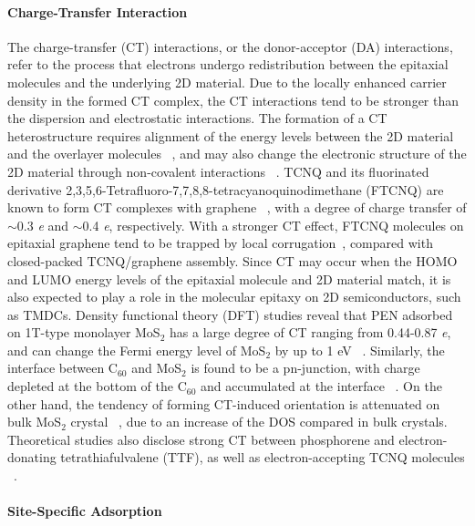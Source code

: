 \paragraph{Charge-Transfer Interaction}
\label{sec:orgebfad7b}

The charge-transfer (CT) interactions, or the donor-acceptor (DA)
interactions, refer to the process that electrons undergo
redistribution between the epitaxial molecules and the underlying 2D
material. Due to the locally enhanced carrier density in the formed CT
complex, the CT interactions tend to be stronger than the dispersion
and electrostatic interactions. The formation of a CT heterostructure
requires alignment of the energy levels between the 2D material and
the overlayer molecules ~\cite{Akiyoshi_2015_DA}, and may also change
the electronic structure of the 2D material through non-covalent
interactions
~\cite{Cai_2015_doping_2D_rev,Wehling_2008_doping,Zhang_2011_rev_pipi_gr}.
TCNQ and its fluorinated derivative
2,3,5,6-Tetra\-fluoro-7,7,8,8-tetra\-cyanoquino\-dimethane (FTCNQ) are
known to form CT complexes with graphene
~\cite{Chen_2007_TCNQ_gr,Voggu_2008_TCNQ,Barja_2010_TCNQ_gr}, with a
degree of charge transfer of $\sim{}$0.3 \textit{e} and $\sim{}$0.4
\textit{e}, respectively. With a stronger CT effect, FTCNQ molecules
on epitaxial graphene tend to be trapped by local
corrugation~\cite{Barja_2010_TCNQ_gr}, compared with closed-packed
TCNQ/graphene assembly.  Since CT may occur when the HOMO and LUMO
energy levels of the epitaxial molecule and 2D material match, it is
also expected to play a role in the molecular epitaxy on 2D
semiconductors, such as TMDCs. Density functional theory (DFT) studies
reveal that PEN adsorbed on 1T-type monolayer MoS\(_{\text{2}}\) has a
large degree of CT ranging from 0.44-0.87 \emph{e}, and can change the
Fermi energy level of MoS\(_{\text{2}}\) by up to 1 eV
~\cite{Shen_2017_DFT_mos2_pent}. Similarly, the interface between
C\(_{\text{60}}\) and MoS\(_{\text{2}}\) is found to be a pn-junction,
with charge depleted at the bottom of the C\(_{\text{60}}\) and
accumulated at the interface ~\cite{Chen_2016_c60_mos2}. On the other
hand, the tendency of forming CT-induced orientation is attenuated on
bulk MoS\(_{\text{2}}\) crystal ~\cite{Sakurai_1991_c60_mos2}, due to
an increase of the DOS compared in bulk crystals. Theoretical studies
also disclose strong CT between phosphorene and electron-donating
tetrathiafulvalene (TTF), as well as electron-accepting TCNQ molecules
~\cite{Zhang_2015_DA_phosphorene}.


\paragraph{Site-Specific Adsorption}
\label{sec:org87b0c12}

